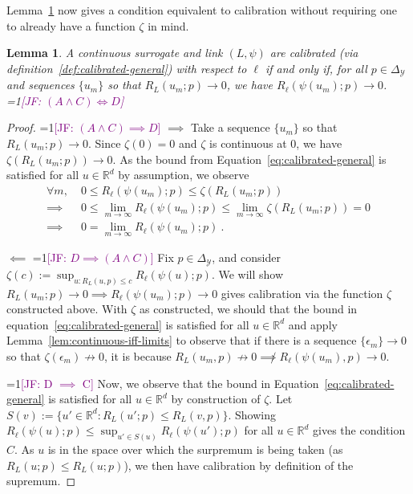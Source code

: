 \documentclass{article}
\newcommand{\Comments}{1}
\newcommand{\mynote}[2]{\ifnum\Comments=1\textcolor{#1}{#2}\fi}
\newcommand{\jessie}[1]{\mynote{purple}{[JF: #1]}}
\newcommand{\reals}{\mathbb{R}}
\newcommand{\simplex}{\Delta_\Y}
\newcommand{\Y}{\mathcal{Y}}
\newtheorem{lemma}{Lemma}
\begin{document}
Lemma~\ref{lem:calib-converging-regrets} now gives a condition equivalent to calibration without requiring one to already have a function $\zeta$ in mind.
\begin{lemma}\label{lem:calib-converging-regrets}
	A continuous surrogate and link $(L,\psi)$ are calibrated (via definition~\ref{def:calibrated-general}) with respect to $\ell$ if and only if, for all $p \in \simplex$ and sequences $\{u_m\}$ so that $R_L(u_m; p) \to 0$, we have $R_\ell(\psi(u_m); p) \to 0$.
	\jessie{$(A \wedge C) \iff D$}
\end{lemma}
\begin{proof}
\jessie{$(A \wedge C) \implies D$}
	$\implies$ Take a sequence $\{u_m\}$ so that $R_L(u_m;p) \to 0$.
	Since $\zeta(0) = 0$ and $\zeta$ is continuous at $0$, we have $\zeta(R_L(u_m;p)) \to 0$.
	As the bound from Equation~\eqref{eq:calibrated-general} is satisfied for all $u \in \reals^d$ by assumption, we observe
	\begin{align*}
	\forall m, \; &0 \leq R_\ell(\psi(u_m); p) \leq \zeta(R_L(u_m;p))\\
	\implies &0 \leq \lim_{m \to \infty} R_\ell(\psi(u_m); p) \leq \lim_{m \to \infty} \zeta(R_L(u_m;p)) = 0\\
	\implies &0 = \lim_{m\to\infty} R_\ell(\psi(u_m); p) ~.~
	\end{align*}
	
	
	$\impliedby$ 
\jessie{$D \implies (A \wedge C)$}
	Fix $p \in \simplex$, and consider $\zeta(c) := \sup_{u: R_L(u,p) \leq c} R_\ell(\psi(u); p)$.  
	We will show $R_L(u_m; p) \to 0 \implies R_\ell(\psi(u_m); p) \to 0$ gives calibration via the function $\zeta$ constructed above. 
	With $\zeta$ as constructed, we should that the bound in equation~\eqref{eq:calibrated-general} is satisfied for all $u \in \reals^d$ and apply Lemma~\ref{lem:continuous-iff-limits} to observe that if there is a sequence $\{\epsilon_m\} \to 0$ so that $\zeta(\epsilon_m) \not \to 0$, it is because $R_L(u_m, p) \not \to 0 \not \implies R_\ell(\psi(u_m), p) \to 0$.
	

\jessie{D $\implies$ C}
Now, we observe that the bound in Equation~\eqref{eq:calibrated-general} is satisfied for all $u \in \reals^d$ by construction of $\zeta$.
Let $S(v) := \{u' \in \reals^d : R_L(u';p) \leq R_L(v,p) \}$.
Showing $R_\ell(\psi(u);p) \leq \sup_{u' \in S(u)} R_\ell(\psi(u') ; p)$ for all $u \in \reals^d$ gives the condition $C$.
As $u$ is in the space over which the surpremum is being taken (as $R_L(u;p) \leq R_L(u;p)$), we then have calibration by definition of the supremum.


\end{proof}
\end{document}
